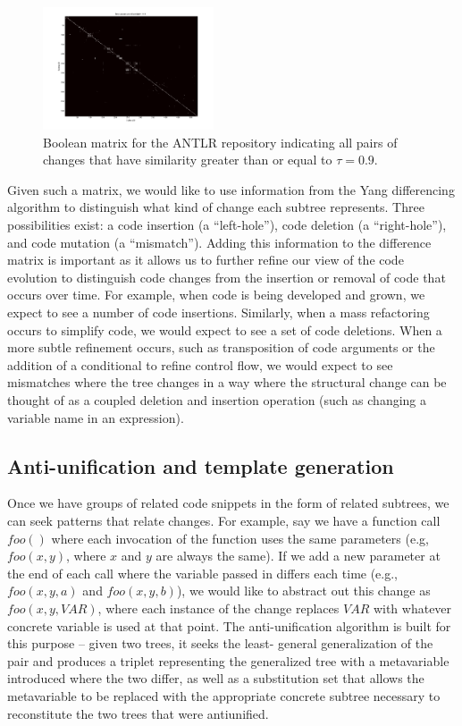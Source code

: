 \begin{figure}
\begin{center}
\includegraphics[width=0.45\textwidth]{figures/distmatrix-0-9.png}
\caption{Boolean matrix for the ANTLR repository indicating all pairs of
changes that have similarity greater than or equal to $\tau = 0.9$.}
\label{fig:boolmat}
\end{center}
\end{figure}

Given such a matrix, we would like to use information from the Yang
differencing algorithm to distinguish what kind of change each subtree
represents.  Three possibilities exist: a code insertion (a ``left-hole''),
code deletion (a ``right-hole''), and code mutation (a ``mismatch'').  Adding
this information to the difference matrix is important as it allows us to
further refine our view of the code evolution to distinguish code changes from
the insertion or removal of code that occurs over time. For example, when code
is being developed and grown, we expect to see a number of code insertions.
Similarly, when a mass refactoring occurs to simplify code, we would expect to
see a set of code deletions.  When a more subtle refinement occurs, such as
transposition of  code arguments or the addition of a conditional to refine
control flow, we would expect to see mismatches where the tree changes in a
way where the structural change can be thought of as a  coupled deletion and
insertion operation (such as changing a variable name in an expression).

\subsection{Anti-unification and template generation}

Once we have groups of related code snippets in the form of related subtrees,
we can seek patterns that relate changes.  For example, say we have a function
call $foo()$ where each invocation of the function uses the same parameters
(e.g, $foo(x,y)$, where $x$ and $y$ are always the same). If we add a new
parameter at the end of each call where the variable passed in differs each
time (e.g., $foo(x,y,a)$ and $foo(x,y,b)$), we would like to abstract out this
change as $foo(x,y,VAR)$, where each instance of the change replaces $VAR$
with whatever concrete variable is used at that point.  The anti-unification
algorithm is built for this purpose -- given two trees, it seeks the least-
general generalization of the pair and produces a triplet representing the
generalized tree with a metavariable introduced where the two differ, as well
as a substitution set that allows the metavariable to be replaced with the
appropriate concrete subtree necessary to reconstitute the two trees that were
antiunified.
